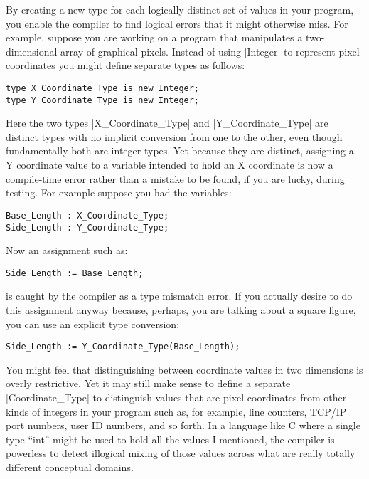 By creating a new type for each logically distinct set of values in your program, you enable the
compiler to find logical errors that it might otherwise miss. For example, suppose you are
working on a program that manipulates a two-dimensional array of graphical pixels. Instead of
using |Integer| to represent pixel coordinates you might define separate types as follows:

\begin{lstlisting}
type X_Coordinate_Type is new Integer;
type Y_Coordinate_Type is new Integer;
\end{lstlisting}

Here the two types |X_Coordinate_Type| and |Y_Coordinate_Type| are distinct types with no
implicit conversion from one to the other, even though fundamentally both are integer types. Yet
because they are distinct, assigning a Y coordinate value to a variable intended to hold an X
coordinate is now a compile-time error rather than a mistake to be found, if you are lucky,
during testing. For example suppose you had the variables:

\begin{lstlisting}
Base_Length : X_Coordinate_Type;
Side_Length : Y_Coordinate_Type;
\end{lstlisting}

\noindent Now an assignment such as:

\begin{lstlisting}
Side_Length := Base_Length;
\end{lstlisting}

\noindent is caught by the compiler as a type mismatch error. If you actually desire to do this
assignment anyway because, perhaps, you are talking about a square figure, you can use an
explicit type conversion:

\begin{lstlisting}
Side_Length := Y_Coordinate_Type(Base_Length);
\end{lstlisting}

You might feel that distinguishing between coordinate values in two dimensions is overly
restrictive. Yet it may still make sense to define a separate |Coordinate_Type| to distinguish
values that are pixel coordinates from other kinds of integers in your program such as, for
example, line counters, TCP/IP port numbers, user ID numbers, and so forth. In a language like C
where a single type ``int'' might be used to hold all the values I mentioned, the compiler is
powerless to detect illogical mixing of those values across what are really totally different
conceptual domains.

